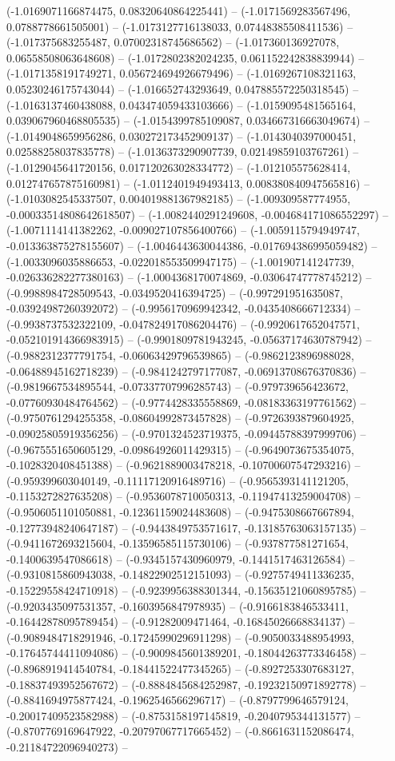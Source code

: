 (-1.0169071166874475, 0.08320640864225441) -- (-1.0171569283567496, 0.0788778661505001) -- (-1.0173127716138033, 0.07448385508411536) -- (-1.017375683255487, 0.07002318745686562) -- (-1.017360136927078, 0.06558508063648608) -- (-1.0172802382024235, 0.061152242838839944) -- (-1.0171358191749271, 0.056724694926679496) -- (-1.0169267108321163, 0.05230246175743044) -- (-1.016652743293649, 0.047885572250318545) -- (-1.0163137460438088, 0.043474059433103666) -- (-1.0159095481565164, 0.039067960468805535) -- (-1.0154399785109087, 0.034667316663049674) -- (-1.0149048659956286, 0.030272173452909137) -- (-1.0143040397000451, 0.02588258037835778) -- (-1.0136373290907739, 0.02149859103767261) -- (-1.0129045641720156, 0.017120263028334772) -- (-1.012105575628414, 0.012747657875160981) -- (-1.0112401949493413, 0.008380840947565816) -- (-1.0103082545337507, 0.004019881367982185) -- (-1.009309587774955, -0.00033514808642618507) -- (-1.0082440291249608, -0.004684171086552297) -- (-1.0071114141382262, -0.009027107856400766) -- (-1.0059115794949747, -0.013363875278155607) -- (-1.0046443630044386, -0.017694386995059482) -- (-1.0033096035886653, -0.022018553509947175) -- (-1.001907141247739, -0.026336282277380163) -- (-1.0004368170074869, -0.03064747778745212) -- (-0.9988984728509543, -0.0349520416394725) -- (-0.997291951635087, -0.03924987260392072) -- (-0.9956170969942342, -0.0435408666712334) -- (-0.9938737532322109, -0.047824917086204476) -- (-0.9920617652047571, -0.052101914366983915) -- (-0.9901809781943245, -0.05637174630787942) -- (-0.9882312377791754, -0.06063429796539865) -- (-0.9862123896988028, -0.06488945162718239) -- (-0.9841242797177087, -0.06913708676370836) -- (-0.9819667534895544, -0.07337707996285743) -- (-0.979739656423672, -0.07760930484764562) -- (-0.9774428335558869, -0.08183363197761562) -- (-0.9750761294255358, -0.08604992873457828) -- (-0.9726393879604925, -0.09025805919356256) -- (-0.9701324523719375, -0.09445788397999706) -- (-0.9675551650605129, -0.09864926011429315) -- (-0.9649073675354075, -0.1028320408451388) -- (-0.9621889003478218, -0.10700607547293216) -- (-0.959399603040149, -0.11117120916489716) -- (-0.9565393141121205, -0.1153272827635208) -- (-0.9536078710050313, -0.11947413259004708) -- (-0.9506051101050881, -0.12361159024483608) -- (-0.9475308667667894, -0.12773948240647187) -- (-0.9443849753571617, -0.13185763063157135) -- (-0.9411672693215604, -0.13596585115730106) -- (-0.937877581271654, -0.1400639547086618) -- (-0.9345157430960979, -0.1441517463126584) -- (-0.9310815860943038, -0.14822902512151093) -- (-0.9275749411336235, -0.15229558424710918) -- (-0.9239956388301344, -0.15635121060895785) -- (-0.9203435097531357, -0.1603956847978935) -- (-0.9166183846533411, -0.16442878095789454) -- (-0.91282009471464, -0.16845026668834137) -- (-0.9089484718291946, -0.17245990296911298) -- (-0.9050033488954993, -0.17645744411094086) -- (-0.9009845601389201, -0.18044263773346458) -- (-0.8968919414540784, -0.18441522477345265) -- (-0.8927253307683127, -0.18837493952567672) -- (-0.8884845684252987, -0.19232150971892778) -- (-0.8841694975877424, -0.1962546566296717) -- (-0.8797799646579124, -0.20017409523582988) -- (-0.8753158197145819, -0.2040795344131577) -- (-0.8707769169647922, -0.20797067717665452) -- (-0.8661631152086474, -0.21184722096940273) -- 
